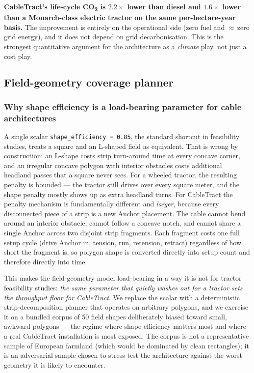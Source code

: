\documentclass[11pt,a4paper]{article}
\begin{document}
\textbf{CableTract's life-cycle CO\textsubscript{2} is $2.2\times$ lower than diesel and $1.6\times$ lower than a Monarch-class electric tractor on the same per-hectare-year basis.} The improvement is entirely on the operational side (zero fuel and ${\approx}$\,zero grid energy), and it does not depend on grid decarbonisation. This is the strongest quantitative argument for the architecture as a \emph{climate} play, not just a cost play.

\subsection{Field-geometry coverage planner}\label{sec:layout}

\subsubsection{Why shape efficiency is a load-bearing parameter for cable architectures}

A single scalar \texttt{shape\_efficiency = 0.85}, the standard shortcut in feasibility studies, treats a square and an L-shaped field as equivalent. That is wrong by construction: an L-shape costs strip turn-around time at every concave corner, and an irregular concave polygon with interior obstacles costs additional headland passes that a square never sees. For a wheeled tractor, the resulting penalty is bounded --- the tractor still drives over every square meter, and the shape penalty mostly shows up as extra headland turns. For CableTract the penalty mechanism is fundamentally different and \emph{larger}, because every disconnected piece of a strip is a new Anchor placement. The cable cannot bend around an interior obstacle, cannot follow a concave notch, and cannot share a single Anchor across two disjoint strip fragments. Each fragment costs one full setup cycle (drive Anchor in, tension, run, retension, retract) regardless of how short the fragment is, so polygon shape is converted directly into setup count and therefore directly into time.

This makes the field-geometry model load-bearing in a way it is not for tractor feasibility studies: \emph{the same parameter that quietly washes out for a tractor sets the throughput floor for CableTract}. We replace the scalar with a deterministic strip-decomposition planner that operates on arbitrary polygons, and we exercise it on a bundled corpus of 50 field shapes deliberately biased toward small, awkward polygons --- the regime where shape efficiency matters most and where a real CableTract installation is most exposed. The corpus is not a representative sample of European farmland (which would be dominated by clean rectangles); it is an adversarial sample chosen to stress-test the architecture against the worst geometry it is likely to encounter.
\end{document}
